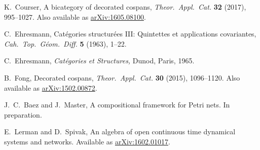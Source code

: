 \documentclass{amsart}
\begin{document}
\begin{thebibliography}{100}

 K.\ Courser, A bicategory of decorated cospans, \emph{Theor.\ Appl.\ Cat.} \textbf{32} (2017), 995--1027. Also available as \href{https://arxiv.org/abs/1605.08100}{arXiv:1605.08100}.



 C.\ Ehresmann, Cat\'egories structur\'ees III: Quintettes et applications covariantes,  \textsl{Cah.\ Top.\ G\'eom.\ Diff.} \textbf{5} (1963), 1--22.

 C.\ Ehresmann, {\sl Cat\'egories et Structures,} Dunod, Paris, 1965.

 B.\ Fong, Decorated cospans, \emph{Theor.\ Appl.\ Cat.} \textbf{30} (2015), 1096--1120. Also available as \href{http://arxiv.org/abs/1502.00872}{arXiv:1502.00872}.





 J.\ C.\ Baez and J.\ Master, A compositional framework for Petri nets. In preparation.

 E.\ Lerman and D.\ Spivak, An algebra of open continuous time dynamical systems and networks. Available as \href{http://arxiv.org/abs/1602.01017}{arXiv:1602.01017}.



\end{thebibliography}
\end{document}
